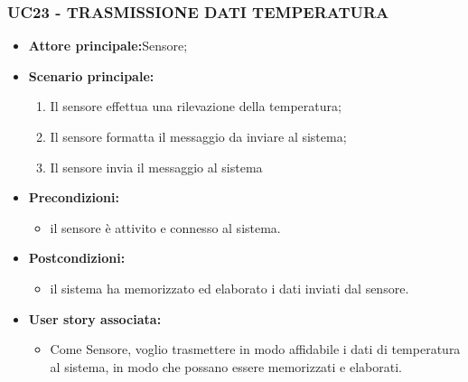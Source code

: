 \subsubsection{UC23 - TRASMISSIONE DATI TEMPERATURA}
\begin{itemize}
    \item \textbf{Attore principale:}Sensore;
    \item \textbf{Scenario principale:}
          \begin{enumerate}
              \item Il sensore effettua una rilevazione della temperatura;
              \item Il sensore formatta il messaggio da inviare al sistema;
              \item Il sensore invia il messaggio al sistema
          \end{enumerate}
    \item \textbf{Precondizioni:}
          \begin{itemize}
              \item  il sensore è attivito e connesso al sistema. 
          \end{itemize}
    \item \textbf{Postcondizioni:}
          \begin{itemize}
              \item  il sistema ha memorizzato ed elaborato i dati inviati dal sensore.
          \end{itemize}
    \item \textbf{User story associata:}
          \begin{itemize}
          \item   Come Sensore, voglio trasmettere in modo affidabile i dati di temperatura al sistema, in modo che possano essere memorizzati e elaborati.
          \end{itemize}
\end{itemize}
